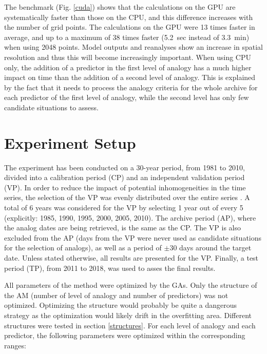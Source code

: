 \documentclass[draft]{agujournal2019}
\begin{document}
The benchmark (Fig. \ref{cuda}) shows that the calculations on the GPU are systematically faster than those on the CPU, and this difference increases with the number of grid points. The calculations on the GPU were 13 times faster in average, and up to a maximum of 38 times faster (5.2~sec instead of 3.3~min) when using 2048 points. Model outputs and reanalyses show an increase in spatial resolution and thus this will become increasingly important. When using CPU only, the addition of a predictor in the first level of analogy has a much higher impact on time than the addition of a second level of analogy. This is explained by the fact that it needs to process the analogy criteria for the whole archive for each predictor of the first level of analogy, while the second level has only few candidate situations to assess.


\section{Experiment Setup}
\label{setup}

The experiment has been conducted on a 30-year period, from 1981 to 2010, divided into a calibration period (CP) and an independent validation period (VP). In order to reduce the impact of potential inhomogeneities in the time series, the selection of the VP was evenly distributed over the entire series \cite<as in>[]{BenDaoud2010}. A total of 6 years was considered for the VP by selecting 1 year out of every 5 (explicitly: 1985, 1990, 1995, 2000, 2005, 2010). The archive period (AP), where the analog dates are being retrieved, is the same as the CP. The VP is also excluded from the AP (days from the VP were never used as candidate situations for the selection of analogs), as well as a period of $\pm30$ days around the target date. Unless stated otherwise, all results are presented for the VP. Finally, a test period (TP), from 2011 to 2018, was used to asses the final results. 

All parameters of the method were optimized by the GAs. Only the structure of the AM (number of level of analogy and number of predictors) was not optimized. Optimizing the structure would probably be quite a dangerous strategy as the optimization would likely drift in the overfitting area. Different structures were tested in section \ref{structures}. For each level of analogy and each predictor, the following parameters were optimized within the corresponding ranges:
\end{document}

